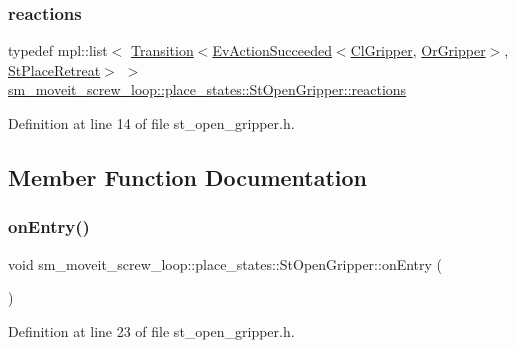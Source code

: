 \subsubsection{\texorpdfstring{reactions}{reactions}}
{\footnotesize\ttfamily typedef mpl\+::list$<$ \hyperlink{classsmacc_1_1Transition}{Transition}$<$\hyperlink{structsmacc_1_1default__events_1_1EvActionSucceeded}{Ev\+Action\+Succeeded}$<$\hyperlink{classsm__moveit__screw__loop_1_1cl__gripper_1_1ClGripper}{Cl\+Gripper}, \hyperlink{classsm__moveit__screw__loop_1_1OrGripper}{Or\+Gripper}$>$, \hyperlink{structsm__moveit__screw__loop_1_1place__states_1_1StPlaceRetreat}{St\+Place\+Retreat}$>$ $>$ \hyperlink{structsm__moveit__screw__loop_1_1place__states_1_1StOpenGripper_ad5cf03bea58766aa719db84ac1c98bf1}{sm\+\_\+moveit\+\_\+screw\+\_\+loop\+::place\+\_\+states\+::\+St\+Open\+Gripper\+::reactions}}



Definition at line 14 of file st\+\_\+open\+\_\+gripper.\+h.



\subsection{Member Function Documentation}
\mbox{\label{structsm__moveit__screw__loop_1_1place__states_1_1StOpenGripper_a7633b91c1212681930d6217847d01d0f}} 
\subsubsection{\texorpdfstring{on\+Entry()}{onEntry()}}
{\footnotesize\ttfamily void sm\+\_\+moveit\+\_\+screw\+\_\+loop\+::place\+\_\+states\+::\+St\+Open\+Gripper\+::on\+Entry (\begin{DoxyParamCaption}{ }\end{DoxyParamCaption})\hspace{0.3cm}{\ttfamily [inline]}}



Definition at line 23 of file st\+\_\+open\+\_\+gripper.\+h.



